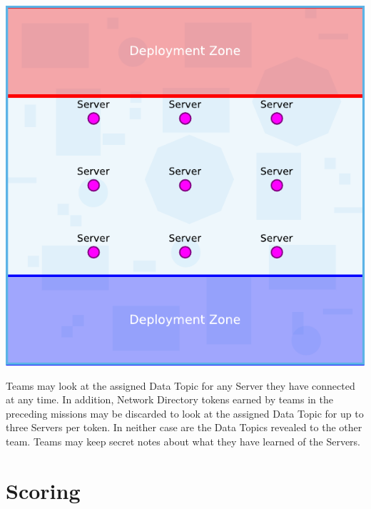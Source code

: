 \begin{minipage}[t]{4in}\centering
\vspace{4pt}   
\includegraphics{maps/map-datacenter}
\end{minipage}

\smallskip
Teams may look at the assigned Data Topic for any Server they have
connected at any time.  In addition, Network Directory tokens earned
by teams in the preceding missions may be discarded to look at the
assigned Data Topic for up to three Servers per token.  In neither
case are the Data Topics revealed to the other team.  Teams may keep
secret notes about what they have learned of the Servers.

\vspace*{-8pt}
\section{Scoring}

